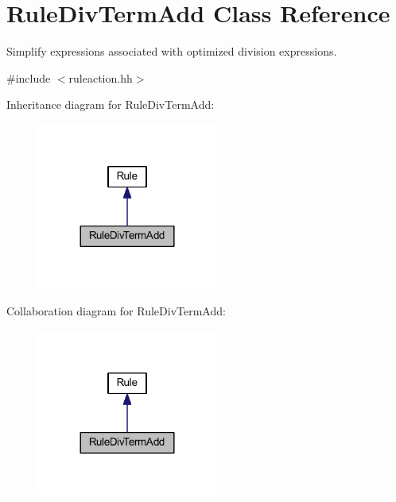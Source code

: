\hypertarget{class_rule_div_term_add}{}\section{Rule\+Div\+Term\+Add Class Reference}
\label{class_rule_div_term_add}


Simplify expressions associated with optimized division expressions.  




{\ttfamily \#include $<$ruleaction.\+hh$>$}



Inheritance diagram for Rule\+Div\+Term\+Add\+:
\nopagebreak
\begin{figure}[H]
\begin{center}
\leavevmode
\includegraphics[width=168pt]{class_rule_div_term_add__inherit__graph}
\end{center}
\end{figure}


Collaboration diagram for Rule\+Div\+Term\+Add\+:
\nopagebreak
\begin{figure}[H]
\begin{center}
\leavevmode
\includegraphics[width=168pt]{class_rule_div_term_add__coll__graph}
\end{center}
\end{figure}
